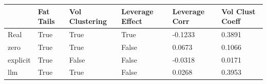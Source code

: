 \begin{tabular}{llllll}
\toprule
 & Fat Tails & Vol Clustering & Leverage Effect & Leverage Corr & Vol Clust Coeff \\
\midrule
Real & True & True & True & -0.1233 & 0.3891 \\
zero & True & True & False & 0.0673 & 0.1066 \\
explicit & True & False & False & -0.0318 & 0.0171 \\
llm & True & True & False & 0.0268 & 0.3953 \\
\bottomrule
\end{tabular}
